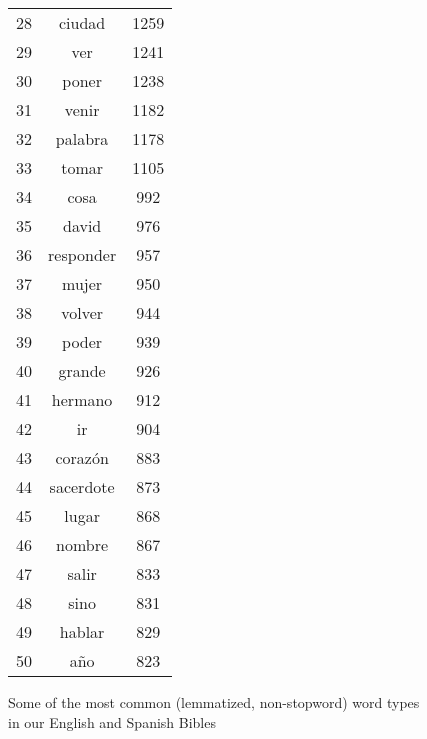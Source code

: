 \begin{figure*}
\begin{tiny}
\begin{centering}
\begin{tabular}{|r|c|c|}
28 & ciudad & 1259 \\
29 & ver & 1241 \\
30 & poner & 1238 \\
31 & venir & 1182 \\
32 & palabra & 1178 \\
33 & tomar & 1105 \\
34 & cosa & 992 \\
35 & david & 976 \\
36 & responder & 957 \\
37 & mujer & 950 \\
38 & volver & 944 \\
39 & poder & 939 \\
40 & grande & 926 \\
41 & hermano & 912 \\
42 & ir & 904 \\
43 & corazón & 883 \\
44 & sacerdote & 873 \\
45 & lugar & 868 \\
46 & nombre & 867 \\
47 & salir & 833 \\
48 & sino & 831 \\
49 & hablar & 829 \\
50 & año & 823 \\
    \hline
  \end{tabular}
  \end{centering}
  \end{tiny}
  \caption{Some of the most common (lemmatized, non-stopword) word types in our
  English and Spanish Bibles}
  \label{fig:mostcommon-en-es}
\end{figure*}

